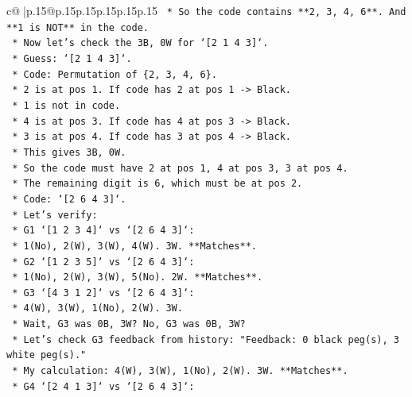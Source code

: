 \documentclass{article}
\begin{document}
{\begin{supertabular}{c@{$\;$}|p{.15\linewidth}@{}p{.15\linewidth}p{.15\linewidth}p{.15\linewidth}p{.15\linewidth}p{.15\linewidth}}
{{{\texttt{            *   So the code contains **2, 3, 4, 6**. And **1 is NOT** in the code.} \\
\texttt{            *   Now let's check the 3B, 0W for `{[}2 1 4 3{]}`.} \\
\texttt{                *   Guess: `{[}2 1 4 3{]}`.} \\
\texttt{                *   Code: Permutation of \{2, 3, 4, 6\}.} \\
\texttt{                *   2 is at pos 1. If code has 2 at pos 1 {-}> Black.} \\
\texttt{                *   1 is not in code.} \\
\texttt{                *   4 is at pos 3. If code has 4 at pos 3 {-}> Black.} \\
\texttt{                *   3 is at pos 4. If code has 3 at pos 4 {-}> Black.} \\
\texttt{                *   This gives 3B, 0W.} \\
\texttt{                *   So the code must have 2 at pos 1, 4 at pos 3, 3 at pos 4.} \\
\texttt{                *   The remaining digit is 6, which must be at pos 2.} \\
\texttt{                *   Code: `{[}2 6 4 3{]}`.} \\
\texttt{                *   Let's verify:} \\
\texttt{                    *   G1 `{[}1 2 3 4{]}` vs `{[}2 6 4 3{]}`:} \\
\texttt{                        *   1(No), 2(W), 3(W), 4(W). 3W. **Matches**.} \\
\texttt{                    *   G2 `{[}1 2 3 5{]}` vs `{[}2 6 4 3{]}`:} \\
\texttt{                        *   1(No), 2(W), 3(W), 5(No). 2W. **Matches**.} \\
\texttt{                    *   G3 `{[}4 3 1 2{]}` vs `{[}2 6 4 3{]}`:} \\
\texttt{                        *   4(W), 3(W), 1(No), 2(W). 3W.} \\
\texttt{                        *   Wait, G3 was 0B, 3W? No, G3 was 0B, 3W?} \\
\texttt{                        *   Let's check G3 feedback from history: "Feedback: 0 black peg(s), 3 white peg(s)."} \\
\texttt{                        *   My calculation: 4(W), 3(W), 1(No), 2(W). 3W. **Matches**.} \\
\texttt{                    *   G4 `{[}2 4 1 3{]}` vs `{[}2 6 4 3{]}`:} \\
}}}
\end{supertabular}}
\end{document}
